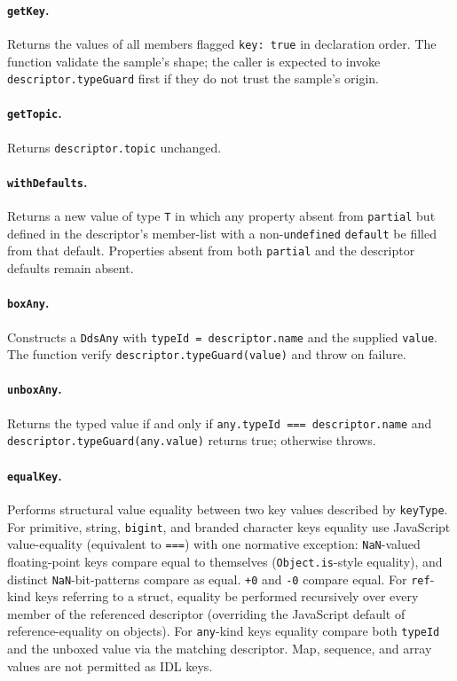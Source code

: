 \documentclass{../styles/zerodds-vendor-spec}
\begin{document}
\paragraph{\texttt{getKey}.} Returns the values of all members
flagged \texttt{key:\,true} in declaration order. The function
 validate the sample's shape; the caller is
expected to invoke \texttt{descriptor.typeGuard} first if they do
not trust the sample's origin.

\paragraph{\texttt{getTopic}.} Returns
\texttt{descriptor.topic} unchanged.

\paragraph{\texttt{withDefaults}.} Returns a new value of type
\texttt{T} in which any property absent from \texttt{partial} but
defined in the descriptor's member-list with a non-\texttt{undefined}
\texttt{default}  be filled from that default.
Properties absent from both \texttt{partial} and the descriptor
defaults remain absent.

\paragraph{\texttt{boxAny}.} Constructs a \texttt{DdsAny} with
\texttt{typeId\,=\,descriptor.name} and the supplied
\texttt{value}. The function  verify
\texttt{descriptor.typeGuard(value)} and throw on failure.

\paragraph{\texttt{unboxAny}.} Returns the typed value if and only
if \texttt{any.typeId\,===\,descriptor.name} and
\texttt{descriptor.typeGuard(any.value)} returns true; otherwise
throws.

\paragraph{\texttt{equalKey}.} Performs structural value
equality between two key values described by \texttt{keyType}.
For primitive, string, \texttt{bigint}, and branded character
keys equality  use JavaScript value-equality
(equivalent to \texttt{===}) with one normative exception:
\texttt{NaN}-valued floating-point keys  compare
equal to themselves (\texttt{Object.is}-style equality), and
distinct \texttt{NaN}-bit-patterns  compare as
equal. \texttt{+0} and \texttt{-0}  compare equal.
For \texttt{ref}-kind keys referring to a struct, equality
 be performed recursively over every member of the
referenced descriptor (overriding the JavaScript default of
reference-equality on objects). For \texttt{any}-kind keys
equality  compare both \texttt{typeId} and the
unboxed value via the matching descriptor. Map, sequence, and
array values are not permitted as IDL keys.
\end{document}
